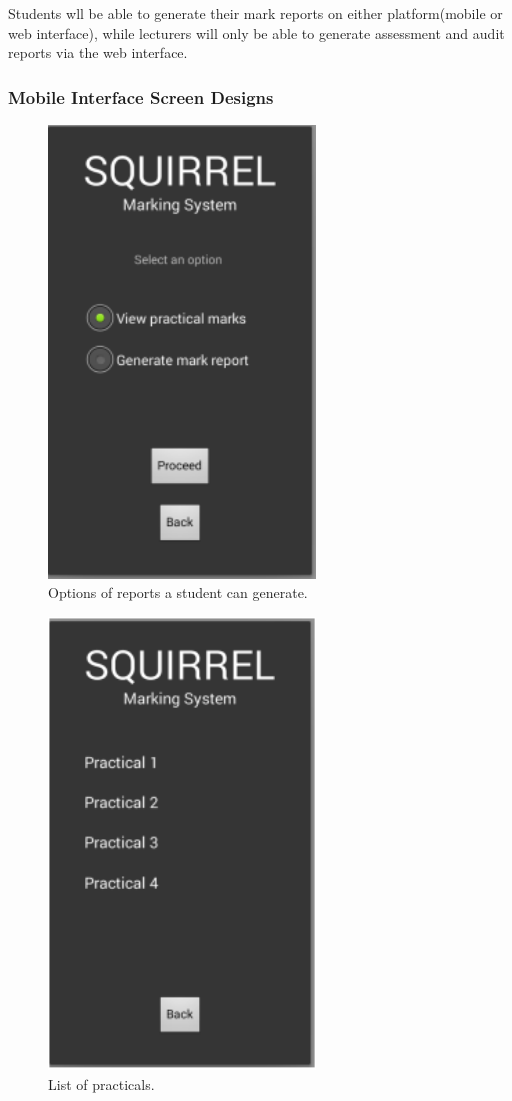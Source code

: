 \documentclass[12pt]{article}
\begin{document}
		Students wll be able to generate their mark reports on either platform(mobile or web interface), while lecturers will only be able to generate assessment and audit reports via the web interface.
	\pagebreak
	\subsubsection{Mobile Interface Screen Designs}
	
		\begin{figure}[htbp]
		\centering
		\includegraphics[width=0.7\linewidth, height=12cm]{./Diagrams/mobile_studentViewOption}
		\caption{Options of reports a student can generate.}
		\label{fig:mobile_studentViewOption}
		\end{figure}
	\pagebreak
		\begin{figure}[htbp]
		\centering
		\includegraphics[width=0.7\linewidth, height=12cm]{./Diagrams/mobile_practicalsView}
		\caption{List of practicals.}
		\label{fig:mobile_practicalsView}
		\end{figure}
	
\end{document}
